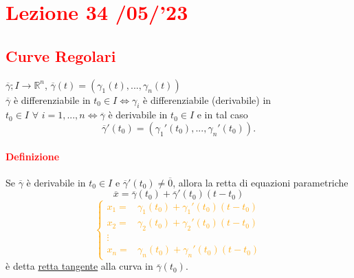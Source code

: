 \documentclass{article}
\newcommand{\R}{\mathbb{R}}
\begin{document}
\newpage
\section{\textcolor{red}{Lezione 34 \space{}/05/'23}}
\subsection{\textcolor{red}{Curve Regolari}}
$\overline{\gamma}; I \rightarrow \R^n$, $\overline{\gamma}(t)=(\gamma_1(t),...,\gamma_n(t))$\\
$\overline{\gamma}$ è differenziabile in $t_0 \in I \Leftrightarrow \gamma_i$ è differenziabile (derivabile) in $t_0 \in I \,\, \forall\,\, i =1,...,n \Leftrightarrow \overline{\gamma}$ è derivabile in $t_0 \in I$ e in tal caso
\begin{equation*}
    \overline{\gamma}'(t_0)=\left( \gamma_1'(t_0),...,\gamma_n'(t_0) \right).
\end{equation*}

\paragraph{\textcolor{red}{Definizione}}
Se $\overline{\gamma}$ è derivabile in $t_0 \in I$ e $\overline{\gamma}' (t_0)\neq \overline{0}$, allora la retta di equazioni parametriche
\begin{equation*}
    \overline{x}=\overline{\gamma}(t_0)+\overline{\gamma}'(t_0)(t-t_0)
\end{equation*}
\textcolor{orange}{
\begin{equation*}
    \begin{cases}
        x_1=&\gamma_1(t_0)+\gamma_1'(t_0)(t-t_0)\\
        x_2=&\gamma_2(t_0)+\gamma_2'(t_0)(t-t_0)\\
        \vdots\\
        x_n=&\gamma_n(t_0)+\gamma_n'(t_0)(t-t_0)
    \end{cases}
\end{equation*}
}
è detta \underline{retta tangente} alla curva in $\overline{\gamma}(t_0)$.
\end{document}
